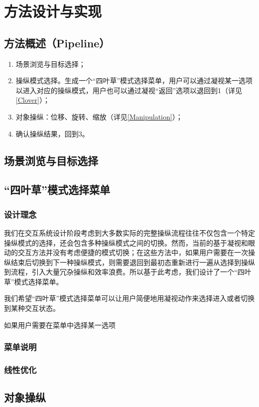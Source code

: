 \chapter{方法设计与实现}

\section{方法概述（Pipeline）}

\begin{enumerate}
	\item 场景浏览与目标选择；
	\item 操纵模式选择。生成一个“四叶草”模式选择菜单，用户可以通过凝视某一选项以进入对应的操纵模式，用户也可以通过凝视“返回”选项以退回到1（详见\autoref{Clover}）；
	\item 对象操纵：位移、旋转、缩放（详见\autoref{Manipulation}）；
	\item 确认操纵结果，回到3。
\end{enumerate}

\section{场景浏览与目标选择}

\section{“四叶草”模式选择菜单}\label{Clover}

\subsection{设计理念}

我们在交互系统设计阶段考虑到大多数实际的完整操纵流程往往不仅包含一个特定操纵模式的选择，还会包含多种操纵模式之间的切换。然而，当前的基于凝视和眼动的交互方法并没有考虑便捷的模式切换；在这些方法中，如果用户需要在一次操纵结束后切换到下一种操纵模式，则需要退回到最初态重新进行一遍从选择到操纵到流程，引入大量冗杂操纵和效率浪费。所以基于此考虑，我们设计了一个“四叶草”模式选择菜单。

我们希望“四叶草”模式选择菜单可以让用户简便地用凝视动作来选择进入或者切换到某种交互状态。

如果用户需要在菜单中选择某一选项


\subsection{菜单说明}

\subsection{线性优化}

\section{对象操纵}\label{Manipulation}
